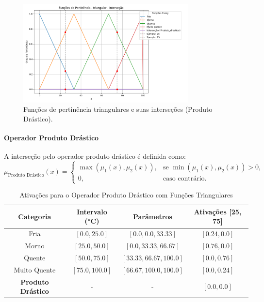 \documentclass[a4paper,12pt]{article}
\begin{document}
\begin{figure}[H]
    \centering
    \includegraphics[width=0.8\textwidth]{img/funções_de_pertinência_triangular_interseção_fuzzificado.png}
    \caption{Funções de pertinência triangulares e suas interseções (Produto Drástico).}
    \label{fig:intersecao_produto_drastico_triangular}
\end{figure}

\paragraph{Operador Produto Drástico}

A interseção pelo operador produto drástico é definida como:
\[
\mu_{\text{Produto Drástico}}(x) =
\begin{cases}
\max(\mu_1(x), \mu_2(x)), & \text{se } \min(\mu_1(x), \mu_2(x)) > 0, \\
0, & \text{caso contrário.}
\end{cases}
\]

\begin{table}[H]
\centering
\caption{Ativações para o Operador Produto Drástico com Funções Triangulares}
\begin{tabular}{|c|c|c|c|}
\hline
\textbf{Categoria}    & \textbf{Intervalo (°C)} & \textbf{Parâmetros}       & \textbf{Ativações [25, 75]} \\ \hline
Fria                  & $[0.0, 25.0]$          & $[0.0, 0.0, 33.33]$       & $[0.24, 0.0]$              \\ \hline
Morno                 & $[25.0, 50.0]$         & $[0.0, 33.33, 66.67]$     & $[0.76, 0.0]$              \\ \hline
Quente                & $[50.0, 75.0]$         & $[33.33, 66.67, 100.0]$   & $[0.0, 0.76]$              \\ \hline
Muito Quente          & $[75.0, 100.0]$        & $[66.67, 100.0, 100.0]$   & $[0.0, 0.24]$              \\ \hline
\textbf{Produto Drástico} & -     & -                         & $[0.0, 0.0]$              \\ \hline
\end{tabular}
\end{table}
\end{document}
